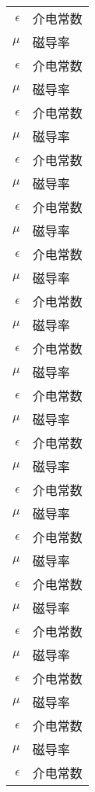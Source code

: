 
\begin{nomenclature*}
\label{chap:symb}


\begin{longtable}{rl}
  $\epsilon$  & 介电常数  \\  
  $\mu$       & 磁导率    \\
  $\epsilon$  & 介电常数  \\
  $\mu$       & 磁导率    \\
  $\epsilon$  & 介电常数  \\
  $\mu$       & 磁导率    \\
  $\epsilon$  & 介电常数  \\
  $\mu$       & 磁导率    \\
  $\epsilon$  & 介电常数  \\
  $\mu$       & 磁导率    \\
  $\epsilon$  & 介电常数  \\
  $\mu$       & 磁导率    \\
  $\epsilon$  & 介电常数  \\
  $\mu$       & 磁导率    \\
  $\epsilon$  & 介电常数  \\
  $\mu$       & 磁导率    \\
  $\epsilon$  & 介电常数  \\
  $\mu$       & 磁导率    \\
  $\epsilon$  & 介电常数  \\
  $\mu$       & 磁导率    \\
  $\epsilon$  & 介电常数  \\
  $\mu$       & 磁导率    \\
  $\epsilon$  & 介电常数  \\
  $\mu$       & 磁导率    \\
  $\epsilon$  & 介电常数  \\
  $\mu$       & 磁导率    \\
  $\epsilon$  & 介电常数  \\
  $\mu$       & 磁导率    \\
  $\epsilon$  & 介电常数  \\
  $\mu$       & 磁导率    \\
  $\epsilon$  & 介电常数  \\
  $\mu$       & 磁导率    \\
  $\epsilon$  & 介电常数  \\

\end{longtable}
\end{nomenclature*}
